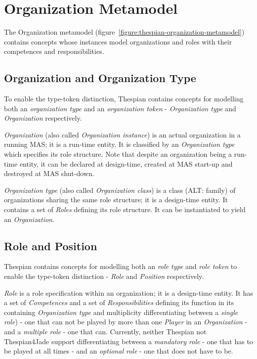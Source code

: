 \section{Organization Metamodel}

The Organization metamodel (figure~\ref{figure:thespian-organization-metamodel}) contains concepts whose instances model organizations and roles with their competences and responsibilities.

\subsection*{Organization and Organization Type}

To enable the type-token distinction, Thespian contains concepts for modelling both an \textit{organization type} and an \textit{organization token} - \textit{Organization type} and \textit{Organization} respectively.

\textit{Organization} (also called \textit{Organization instance}) is an actual organization in a running MAS; it is a run-time entity.
It is classified by an \textit{Organization type} which specifies its role structure.
Note that despite an organization being a run-time entity, it can be declared at design-time, created at MAS start-up and destroyed at MAS shut-down.

\textit{Organization type} (also called \textit{Organization class}) is a class (ALT: family) of organizations sharing the same role structure; it is a design-time entity.
It contains a set of \textit{Roles} defining its role structure.
It can be instantiated to yield an \textit{Organization}. 

\subsection*{Role and Position}

Thespian contains concepts for modelling both an \textit{role type} and \textit{role token} to enable the type-token distinction - \textit{Role} and \textit{Position} respectively.

\textit{Role} is a role specification within an organization; it is a design-time entity.
It has a set of \textit{Competences} and a set of \textit{Responsibilities} defining its function in its containing \textit{Organization type} and multiplicity differentiating between a \textit{single role}) - one that can not be played by more than one \textit{Player} in an \textit{Organization} - and a \textit{multiple role} - one that can.
Currently, neither Thespian not Thespian4Jade support differentiating between a \textit{mandatory role} - one that has to be played at all times - and an \textit{optional role} - one that does not have to be.


